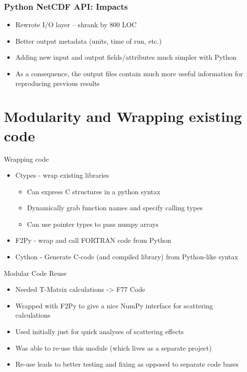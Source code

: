 \documentclass[red, hyperref={pdfpagelabels=false}]{beamer}
\begin{document}
\begin{frame}
  \frametitle{Python NetCDF API: Impacts}
  \begin{itemize}
    \item Rewrote I/O layer -- shrank by 800 LOC
    \item Better output metadata (units, time of run, etc.)
    \item Adding new input and output fields/attributes much simpler with Python
    \item As a consequence, the output files contain much more useful
      information for reproducing previous results
  \end{itemize}
\end{frame}

\section[Modularity]{Modularity and Wrapping existing code}
\begin{frame}{Wrapping code}
  \begin{itemize}
    \item<1-> \alert<4->{Ctypes} - wrap existing libraries
    \begin{itemize}
        \item Can express C structures in a python syntax
        \item Dynamically grab function names and specify calling types
        \item Can use pointer types to pass numpy arrays
    \end{itemize}
    \item<2-> \alert<4->{F2Py} - wrap and call FORTRAN code from Python
    \item<3-> Cython - Generate C-code (and compiled library) from Python-like syntax
  \end{itemize}
\end{frame}

\begin{frame}[<+->]{Modular Code Reuse}
  \begin{itemize}
    \item Needed T-Matrix calculations -> F77 Code
    \item Wrapped with F2Py to give a nice NumPy interface for scattering calculations
    \item Used initially just for quick analyses of scattering effects
    \item Was able to re-use this module (which lives as a separate project)
    \item Re-use leads to better testing and fixing as opposed to separate code bases
  \end{itemize}
\end{frame}
\end{document}
